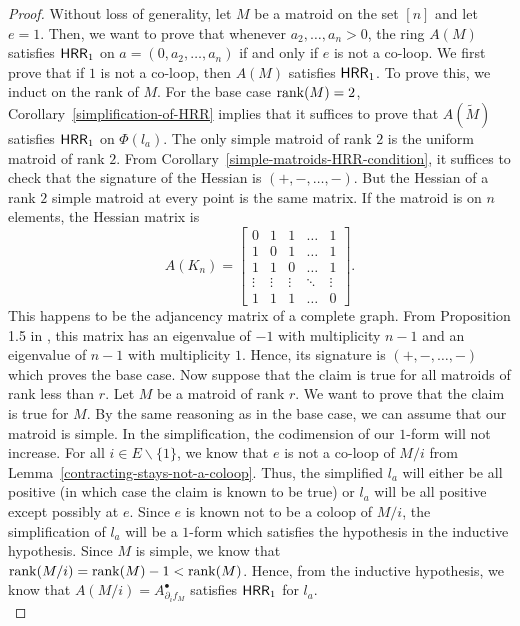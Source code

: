 \documentclass{puthesis-UG}
\begin{document}
\begin{proof}
	Without loss of generality, let $M$ be a matroid on the set $[n]$ and let $e = 1$. Then, we want to prove that whenever $a_2, \ldots, a_n > 0$, the ring $A(M)$ satisfies $\mathsf{HRR}_1$ on $a = (0, a_2, \ldots, a_n)$ if and only if $e$ is not a co-loop. We first prove that if $1$ is not a co-loop, then $A(M)$ satisfies $\mathsf{HRR}_1$. To prove this, we induct on the rank of $M$. For the base case $\operatorname{rank} (M) = 2$, Corollary~\ref{simplification-of-HRR} implies that it suffices to prove that $A(\widetilde{M})$ satisfies $\mathsf{HRR}_1$ on $\Phi(l_a)$. The only simple matroid of rank $2$ is the uniform matroid of rank $2$. From Corollary~\ref{simple-matroids-HRR-condition}, it suffices to check that the signature of the Hessian is $(+, -, \ldots, -)$. But the Hessian of a rank $2$ simple matroid at every point is the same matrix. If the matroid is on $n$ elements, the Hessian matrix is 
	\[
		A(K_n) = \begin{bmatrix} 
			0 & 1 & 1 & \ldots & 1 \\
			1 & 0 & 1 & \ldots & 1 \\
			1 & 1 & 0 & \ldots & 1 \\
			\vdots & \vdots & \vdots & \ddots & \vdots \\
			1 & 1 & 1 & \ldots & 0
		\end{bmatrix}.
	\]
	This happens to be the adjancency matrix of a complete graph. From Proposition 1.5 in \cite{Stanley-alg-combo}, this matrix has an eigenvalue of $-1$ with multiplicity $n-1$ and an eigenvalue of $n-1$ with multiplicity $1$. Hence, its signature is $(+, -, \ldots, -)$ which proves the base case. Now suppose that the claim is true for all matroids of rank less than $r$. Let $M$ be a matroid of rank $r$. We want to prove that the claim is true for $M$. By the same reasoning as in the base case, we can assume that our matroid is simple. In the simplification, the codimension of our $1$-form will not increase. For all $i \in E \backslash \{1\}$, we know that $e$ is not a co-loop of $M / i$ from Lemma~\ref{contracting-stays-not-a-coloop}. Thus, the simplified $l_a$ will either be all positive (in which case the claim is known to be true) or $l_a$ will be all positive except possibly at $e$. Since $e$ is known not to be a coloop of $M / i$, the simplification of $l_a$ will be a $1$-form which satisfies the hypothesis in the inductive hypothesis. Since $M$ is simple, we know that $\operatorname{rank} (M / i) = \operatorname{rank} (M) - 1 < \operatorname{rank} (M)$. Hence, from the inductive hypothesis, we know that $A(M/i) = A_{\partial_i f_M}^\bullet$ satisfies $\mathsf{HRR}_1$ for $l_a$. \\


\end{proof}
\end{document}
